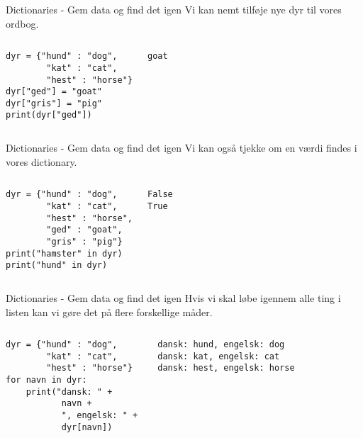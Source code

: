 \documentclass[main.tex]{subfiles}
\begin{document}
\begin{frame}[fragile]{Dictionaries - Gem data og find det igen}
	Vi kan nemt tilføje nye dyr til vores ordbog.
	\begin{columns}
		\begin{lstlisting}[style=python]
dyr = {"hund" : "dog", 
		"kat" : "cat", 
		"hest" : "horse"}
dyr["ged"] = "goat"
dyr["gris"] = "pig"
print(dyr["ged"])
		\end{lstlisting}
		
		\pause
		\begin{lstlisting}[style=python]
goat
		\end{lstlisting}
	\end{columns}	
\end{frame}

\begin{frame}[fragile]{Dictionaries - Gem data og find det igen}
	Vi kan også tjekke om en værdi findes i vores dictionary.
	\begin{columns}
		\column{0.4\textwidth}
		\begin{lstlisting}[style=python]
dyr = {"hund" : "dog", 
        "kat" : "cat", 
        "hest" : "horse",
        "ged" : "goat",
        "gris" : "pig"}
print("hamster" in dyr)
print("hund" in dyr)
		\end{lstlisting}
		
		\pause
		\column{0.4\textwidth}
		\begin{lstlisting}[style=python]
False
True
		\end{lstlisting}
	\end{columns}	
\end{frame}

\begin{frame}[fragile]{Dictionaries - Gem data og find det igen}
	Hvis vi skal løbe igennem alle ting i listen kan vi gøre det på flere forskellige måder.
	\begin{columns}
		\begin{lstlisting}[style=python]
dyr = {"hund" : "dog", 
        "kat" : "cat", 
        "hest" : "horse"}
for navn in dyr:
	print("dansk: " + 
	       navn + 
	       ", engelsk: " + 
	       dyr[navn])
		\end{lstlisting}
		
		\pause
		\begin{lstlisting}[style=python]
dansk: hund, engelsk: dog
dansk: kat, engelsk: cat
dansk: hest, engelsk: horse
		\end{lstlisting}
	\end{columns}	
\end{frame}
\end{document}

